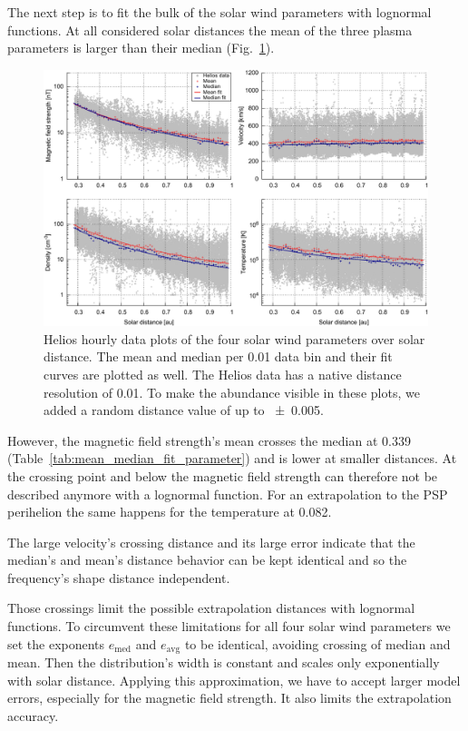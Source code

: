 The next step is to fit the bulk of the solar wind parameters with lognormal functions. At all considered solar distances the mean of the three plasma parameters is larger than their median (Fig.~\ref{fig:radial_fit_4_thesis_light_skip_pdfcairo_plot}).
\begin{figure}
	\includegraphics[width=18cm]{figures/radial_fit_4_thesis_light_skip_pdfcairo_plot.pdf}
	\caption{Helios hourly data plots of the four solar wind parameters over solar distance. The mean and median per \SI{0.01}{\au} data bin and their fit curves are plotted as well. The Helios data has a native distance resolution of \SI{0.01}{\au}. To make the abundance visible in these plots, we added a random distance value of up to \SI{+-0.005}{\au}.}
	\label{fig:radial_fit_4_thesis_light_skip_pdfcairo_plot}
\end{figure}
However, the magnetic field strength's mean crosses the median at \SI{0.339}{\au} (Table~\ref{tab:mean_median_fit_parameter}) and is lower at smaller distances. At the crossing point and below the magnetic field strength can therefore not be described anymore with a lognormal function. For an extrapolation to the PSP perihelion the same happens for the temperature at \SI{0.082}{\au}.

The large velocity's crossing distance and its large error indicate that the median's and mean's distance behavior can be kept identical and so the frequency's shape distance independent.

Those crossings limit the possible extrapolation distances with lognormal functions. To circumvent these limitations for all four solar wind parameters we set the exponents $e_\text{med}$ and $e_\text{avg}$ to be identical, avoiding crossing of median and mean. Then the distribution's width is constant and scales only exponentially with solar distance. Applying this approximation, we have to accept larger model errors, especially for the magnetic field strength. It also limits the extrapolation accuracy.

